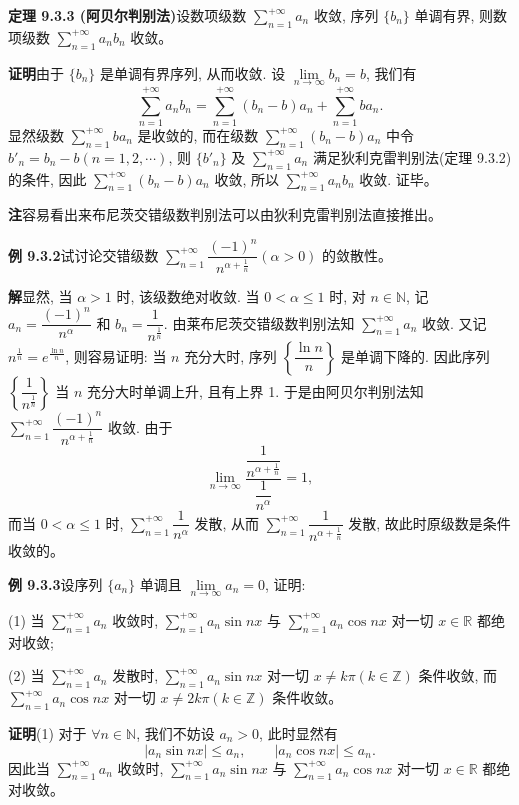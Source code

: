 \documentclass[UTF8, 12pt, fontset=fandol, oneside]{ctexart}
\begin{document}
\noindent\textbf{定理 9.3.3 (阿贝尔判别法)}\quad 设数项级数 $\sum\limits_{n=1}^{+\infty}a_n$ 收敛, 序列 $\{b_n\}$ 单调有界, 则数项级数 $\sum\limits_{n=1}^{+\infty}a_nb_n$ 收敛。

\noindent\textbf{证明}\quad 由于 $\{b_n\}$ 是单调有界序列, 从而收敛. 设 $\lim\limits_{n\to\infty}b_n=b$, 我们有
\[
  \sum_{n=1}^{+\infty}a_nb_n
  =\sum_{n=1}^{+\infty}(b_n-b)a_n+\sum_{n=1}^{+\infty}ba_n.
\]
显然级数 $\sum\limits_{n=1}^{+\infty}ba_n$ 是收敛的, 而在级数 $\sum\limits_{n=1}^{+\infty}(b_n-b)a_n$ 中令 $b'_n=b_n-b(n=1,2,\cdots)$, 则 $\{b'_n\}$ 及 $\sum\limits_{n=1}^{+\infty}a_n$ 满足狄利克雷判别法(定理 9.3.2)的条件, 因此 $\sum\limits_{n=1}^{+\infty}(b_n-b)a_n$ 收敛, 所以 $\sum\limits_{n=1}^{+\infty}a_nb_n$ 收敛. 证毕。

\noindent\textbf{注}\quad 容易看出来布尼茨交错级数判别法可以由狄利克雷判别法直接推出。

\noindent\textbf{例 9.3.2}\quad 试讨论交错级数 $\sum\limits_{n=1}^{+\infty}\dfrac{(-1)^n}{n^{\alpha+\frac1n}}(\alpha>0)$ 的敛散性。

\noindent\textbf{解}\quad 显然, 当 $\alpha>1$ 时, 该级数绝对收敛. 当 $0<\alpha\leq1$ 时, 对 $n\in\mathbb{N}$, 记 $a_n=\dfrac{(-1)^n}{n^\alpha}$ 和 $b_n=\dfrac1{n^{\frac1n}}$. 由莱布尼茨交错级数判别法知 $\sum\limits_{n=1}^{+\infty}a_n$ 收敛. 又记 $n^{\frac1n}=e^{\frac{\ln n}{n}}$, 则容易证明: 当 $n$ 充分大时, 序列 $\left\{\dfrac{\ln n}{n}\right\}$ 是单调下降的. 因此序列 $\left\{\dfrac1{n^{\frac1n}}\right\}$ 当 $n$ 充分大时单调上升, 且有上界 1. 于是由阿贝尔判别法知 $\sum\limits_{n=1}^{+\infty}\dfrac{(-1)^n}{n^{\alpha+\frac1n}}$ 收敛. 由于
\[
  \lim_{n\to\infty}\frac{\dfrac1{n^{\alpha+\frac1n}}}{\dfrac1{n^\alpha}}=1,
\]
而当 $0<\alpha\leq1$ 时, $\sum\limits_{n=1}^{+\infty}\dfrac1{n^\alpha}$ 发散, 从而 $\sum\limits_{n=1}^{+\infty}\dfrac1{n^{\alpha+\frac1n}}$ 发散, 故此时原级数是条件收敛的。

\noindent\textbf{例 9.3.3}\quad 设序列 $\{a_n\}$ 单调且 $\lim\limits_{n\to\infty}a_n=0$, 证明:

(1) 当 $\sum\limits_{n=1}^{+\infty}a_n$ 收敛时, $\sum\limits_{n=1}^{+\infty}a_n\sin nx$ 与 $\sum\limits_{n=1}^{+\infty}a_n\cos nx$ 对一切 $x\in\mathbb{R}$ 都绝对收敛;

(2) 当 $\sum\limits_{n=1}^{+\infty}a_n$ 发散时, $\sum\limits_{n=1}^{+\infty}a_n\sin nx$ 对一切 $x\neq k\pi(k\in\mathbb{Z})$ 条件收敛, 而 $\sum\limits_{n=1}^{+\infty}a_n\cos nx$ 对一切 $x\neq2k\pi(k\in\mathbb{Z})$ 条件收敛。

\noindent\textbf{证明}\quad (1) 对于 $\forall n\in\mathbb{N}$, 我们不妨设 $a_n>0$, 此时显然有
\[
  |a_n\sin nx|\leq a_n,\qquad |a_n\cos nx|\leq a_n.
\]
因此当 $\sum\limits_{n=1}^{+\infty}a_n$ 收敛时, $\sum\limits_{n=1}^{+\infty}a_n\sin nx$ 与 $\sum\limits_{n=1}^{+\infty}a_n\cos nx$ 对一切 $x\in\mathbb{R}$ 都绝对收敛。
\end{document}
